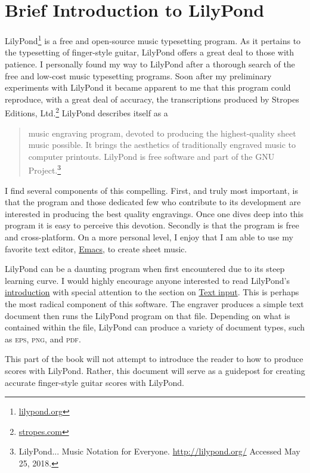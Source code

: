 \documentclass[]{memoir}
\begin{document}
\chapter{Brief Introduction to LilyPond}
\label{cha:brief-intr-lilyp}

LilyPond\footnote{\url{lilypond.org}} is a free and open-source music
typesetting program. As it pertains to the typesetting of finger-style
guitar, LilyPond offers a great deal to those with patience. I
personally found my way to LilyPond after a thorough search of the
free and low-cost music typesetting programs. Soon after my
preliminary experiments with LilyPond it became apparent to me that
this program could reproduce, with a great deal of accuracy, the
transcriptions produced by Stropes Editions,
Ltd.\footnote{\url{stropes.com}} LilyPond describes itself as a
\begin{quotation}
  \noindent music engraving program, devoted to producing the
  highest-quality sheet music possible.  It brings the aesthetics of
  traditionally engraved music to computer printouts. LilyPond is free
  software and part of the GNU Project.\footnote{LilyPond... Music
    Notation for Everyone. \url{http://lilypond.org/} Accessed May 25,
    2018.}
\end{quotation}
I find several components of this compelling. First, and truly most
important, is that the program and those dedicated few who contribute
to its development are interested in producing the best quality
engravings. Once one dives deep into this program it is easy to
perceive this devotion. Secondly is that the program is free and
cross-platform. On a more personal level, I enjoy that I am able to
use my favorite text editor,
\href{https://www.gnu.org/software/emacs/}{Emacs}, to create sheet
music.

LilyPond can be a daunting program when first encountered due to its
steep learning curve. I would highly encourage anyone interested to
read LilyPond's
\href{http://lilypond.org/introduction.html}{introduction} with
special attention to the section on
\href{http://lilypond.org/text-input.html}{Text input}. This is
perhaps the most radical component of this software. The engraver
produces a simple text document then runs the LilyPond program on that
file. Depending on what is contained within the file, LilyPond can
produce a variety of document types, such as \textsc{eps},
\textsc{png}, and \textsc{pdf}.

This part of the book will not attempt to introduce the reader to how
to produce scores with LilyPond. Rather, this document will serve as a
guidepost for creating accurate finger-style guitar scores with
LilyPond.
\end{document}
